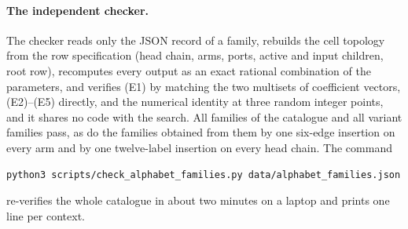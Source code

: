 \documentclass[11pt,a4paper]{article}
\theoremstyle{plain}
\theoremstyle{definition}
\theoremstyle{remark}
\begin{document}
\paragraph{The independent checker.}
The checker reads only the JSON record of a family, rebuilds the cell
topology from the row specification (head chain, arms, ports, active and
input children, root row), recomputes every output as an exact rational
combination of the parameters, and verifies (E1) by matching the two
multisets of coefficient vectors, (E2)--(E5) directly, and the numerical
identity at three random integer points, and it shares no code with the search.
All \NumCatFamilies{} families of the catalogue and all
\NumVariantFamilies{} variant families pass, as do the families obtained
from them by one six-edge insertion on every arm and by one twelve-label
insertion on every head chain.  The command
\begin{verbatim}
python3 scripts/check_alphabet_families.py data/alphabet_families.json
\end{verbatim}
re-verifies the whole catalogue in about two minutes on a laptop and prints
one line per context.
\end{document}

